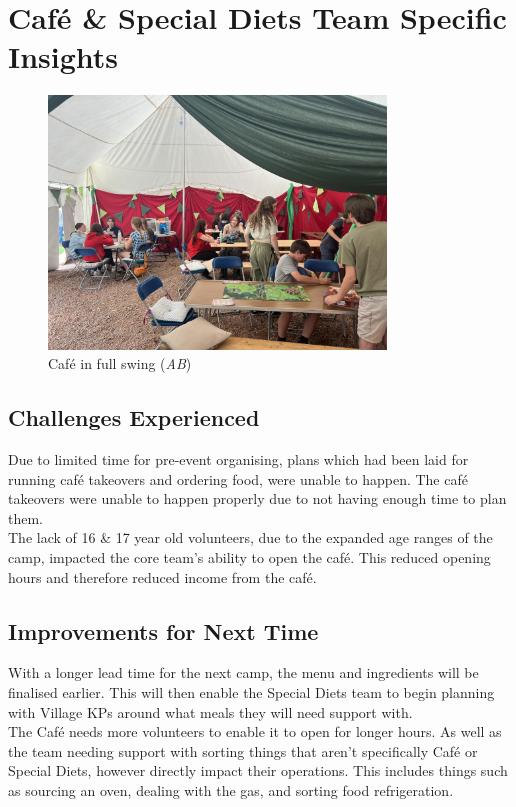 \section{Café \& Special Diets Team Specific Insights}
\begin{figure}[ht]
    \centering
    \includegraphics[width=0.8\textwidth]{assets/cafe-full-swing-ab.jpeg}
    \caption{Café in full swing (\textit{AB})}
\end{figure}
\subsection{Challenges Experienced}
Due to limited time for pre-event organising, plans which had been laid for running café takeovers and ordering food, were unable to happen. The café takeovers were unable to happen properly due to not having enough time to plan them.\\

The lack of 16 \& 17 year old volunteers, due to the expanded age ranges of the camp, impacted the core team's ability to open the café. This reduced opening hours and therefore reduced income from the café.
\subsection{Improvements for Next Time}
With a longer lead time for the next camp, the menu and ingredients will be finalised earlier. This will then enable the Special Diets team to begin planning with Village KPs around what meals they will need support with.\\

The Café needs more volunteers to enable it to open for longer hours. As well as the team needing support with sorting things that aren't specifically Café or Special Diets, however directly impact their operations. This includes things such as sourcing an oven, dealing with the gas, and sorting food refrigeration.
